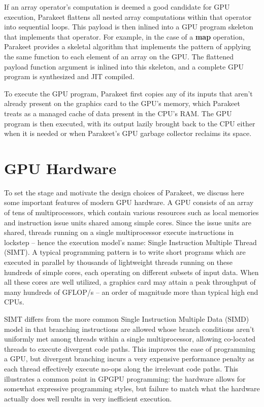 \documentclass[preprint]{sigplanconf}
\begin{document}
If an array operator's computation is deemed a good candidate for GPU execution, Parakeet flattens all nested array computations within that operator into sequential loops.  This payload is then inlined into a GPU program skeleton that implements that operator.  For example, in the case of a \textbf{map} operation, Parakeet provides a skeletal algorithm that implements the pattern of applying the same function to each element of an array on the GPU.  The flattened payload function argument is inlined into this skeleton, and a complete GPU program is synthesized and JIT compiled.

To execute the GPU program, Parakeet first copies any of its inputs that aren't already present on the graphics card to the GPU's memory, which Parakeet treats as a managed cache of data present in the CPU's RAM. The GPU program is then executed, with its output lazily brought back to the CPU either when it is needed or when Parakeet's GPU garbage collector reclaims its space. 

\section{GPU Hardware}
To set the stage and motivate the design choices of Parakeet, we discuss here some important features of modern GPU hardware.  A GPU consists of an array of tens of multiprocessors, which contain various resources such as local memories and instruction issue units shared among simple cores. Since the issue units are shared, threads running on a single multiprocessor execute instructions in lockstep -- hence the execution model's name: Single Instruction Multiple Thread (SIMT).  A typical programming pattern is to write short programs which are executed in parallel by thousands of lightweight threads running on these hundreds of simple cores, each operating on different subsets of input data. When all these cores are well utilized, a graphics card may attain a peak throughput of many hundreds of GFLOP/s -- an order of magnitude more than typical high end CPUs.

SIMT differs from the more common Single Instruction Multiple Data (SIMD) model in that branching instructions are allowed whose branch conditions aren't uniformly met among threads within a single multiprocessor, allowing co-located threads to execute divergent code paths.  This improves the ease of programming a GPU, but divergent branching incurs a very expensive performance penalty as each thread effectively execute no-ops along the irrelevant code paths.  This illustrates a common point in GPGPU programming: the hardware allows for somewhat expressive programming styles, but failure to match what the hardware actually does well results in very inefficient execution.
\end{document}
